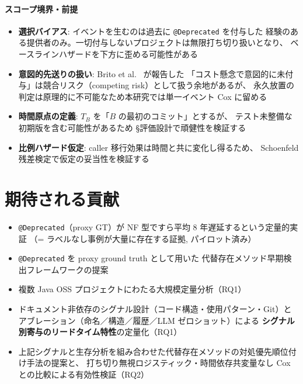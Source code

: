 \documentclass[a4paper,12pt]{article}
\begin{document}
\paragraph{スコープ境界・前提}
\begin{itemize}
  \item \textbf{選択バイアス}: イベントを生むのは過去に \texttt{@Deprecated} を付与した
        経験のある提供者のみ。一切付与しないプロジェクトは無限打ち切り扱いとなり、
        ベースラインハザードを下方に歪める可能性がある
  \item \textbf{意図的先送りの扱い}: Brito et al.~\cite{brito2017java-bc} が報告した
        「コスト懸念で意図的に未付与」は競合リスク（competing risk）として扱う余地があるが、
        永久放置の判定は原理的に不可能なため本研究では単一イベント Cox に留める
  \item \textbf{時間原点の定義}: $T_B$ を「$B$ の最初のコミット」とするが、
        テスト未整備な初期版を含む可能性があるため §評価設計で頑健性を検証する
  \item \textbf{比例ハザード仮定}: caller 移行効果は時間と共に変化し得るため、
        Schoenfeld 残差検定で仮定の妥当性を検証する
\end{itemize}

\section{期待される貢献}

\begin{itemize}
  \item[$\checkmark$] \texttt{@Deprecated}（proxy GT）が NF 型ですら平均 8 年遅延するという定量的実証
        （= ラベルなし事例が大量に存在する証拠, パイロット済み）
  \item[$\square$] \texttt{@Deprecated} を proxy ground truth として用いた
        代替存在メソッド早期検出フレームワークの提案
  \item[$\square$] 複数 Java OSS プロジェクトにわたる大規模定量分析（RQ1）
  \item[$\square$] ドキュメント非依存のシグナル設計（コード構造・使用パターン・Git）と
        アブレーション（命名／構造／履歴／LLM ゼロショット）による
        \textbf{シグナル別寄与のリードタイム特性}の定量化（RQ1）
  \item[$\square$] 上記シグナルと生存分析を組み合わせた代替存在メソッドの対処優先順位付け手法の提案と、
        打ち切り無視ロジスティック・時間依存共変量なし Cox との比較による有効性検証（RQ2）
\end{itemize}
\end{document}
